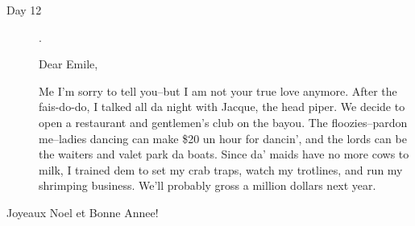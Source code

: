 \documentclass[fleqn,addpoints]{exam}
\begin{document}
\begin{description}
\item[Day 12].

Dear Emile,

Me I'm sorry to tell you--but I am not your true love anymore. After the fais-do-do, I talked all da night with Jacque,
the head piper. We decide to open a restaurant and gentlemen's club on the bayou. The floozies--pardon me--ladies
dancing can make \$20 un hour for dancin', and the lords can be the waiters and valet park da boats. Since da' maids
have no more cows to milk, I trained dem to set my crab traps, watch my trotlines, and run my shrimping business. We'll
probably gross a million dollars next year.

\end{description}

Joyeaux Noel et Bonne Annee!

\vspace{2 cm}

\fi


\end{document}
